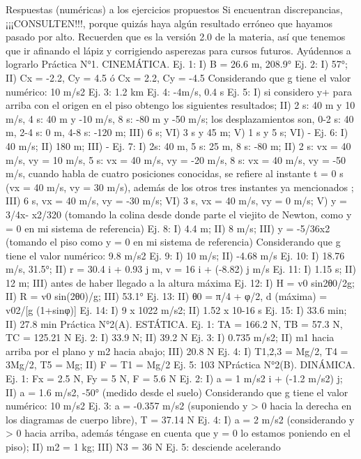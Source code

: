 Respuestas (numéricas) a los
ejercicios propuestos
Si encuentran discrepancias, ¡¡¡CONSULTEN!!!, porque
quizás haya algún resultado erróneo que hayamos pasado por
alto.
Recuerden que es la versión 2.0 de la materia, así que tenemos
que ir afinando el lápiz y corrigiendo asperezas para cursos
futuros. Ayúdennos a lograrlo 
Práctica N°1. CINEMÁTICA.
Ej. 1: I) B = 26.6 m, 208.9°
Ej. 2: I) 57°; II) Cx = -2.2, Cy = 4.5 ó Cx = 2.2, Cy = -4.5
Considerando que g tiene el valor numérico: 10 m/s2
Ej. 3: 1.2 km
Ej. 4: -4m/s, 0.4 s
Ej. 5: I) si considero y+ para arriba con el origen en el piso obtengo los siguientes
resultados; II) 2 s: 40 m y 10 m/s, 4 s: 40 m y -10 m/s, 8 s: -80 m y -50 m/s; los
desplazamientos son, 0-2 s: 40 m, 2-4 s: 0 m, 4-8 s: -120 m; III) 6 s; VI) 3 s y 45 m; V) 1 s y 5
s; VI) -
Ej. 6: I) 40 m/s; II) 180 m; III) -
Ej. 7: I) 2s: 40 m, 5 s: 25 m, 8 s: -80 m; II) 2 s: vx = 40 m/s, vy = 10 m/s, 5 s: vx = 40 m/s, vy =
-20 m/s, 8 s: vx = 40 m/s, vy = -50 m/s, cuando habla de cuatro posiciones conocidas, se
refiere al instante t = 0 s (vx = 40 m/s, vy = 30 m/s), además de los otros tres instantes ya
mencionados ; III) 6 s, vx = 40 m/s, vy = -30 m/s; VI) 3 s, vx = 40 m/s, vy = 0 m/s; V) y = 3/4x-
x2/320 (tomando la colina desde donde parte el viejito de Newton, como y = 0 en mi sistema
de referencia)
Ej. 8: I) 4.4 m; II) 8 m/s; III) y = -5/36x2 (tomando el piso como y = 0 en mi sistema de
referencia)
Considerando que g tiene el valor numérico: 9.8 m/s2
Ej. 9: I) 10 m/s; II) -4.68 m/s
Ej. 10: I) 18.76 m/s, 31.5°; II) r = 30.4 i + 0.93 j m, v = 16 i + (-8.82) j m/s
Ej. 11: I) 1.15 s; II) 12 m; III) antes de haber llegado a la altura máxima
Ej. 12: I) H = v0 sin2θ0/2g; II) R = v0 sin(2θ0)/g; III) 53.1°
Ej. 13: II) θ0 = π/4 + φ/2, d (máxima) = v02/[g (1+sinφ)]
Ej. 14: I) 9 x 1022 m/s2; II) 1.52 x 10-16 s
Ej. 15: I) 33.6 min; II) 27.8 min
Práctica N°2(A). ESTÁTICA.
Ej. 1: TA = 166.2 N, TB = 57.3 N, TC = 125.21 N
Ej. 2: I) 33.9 N; II) 39.2 N
Ej. 3: I) 0.735 m/s2; II) m1 hacia arriba por el plano y m2 hacia abajo; III) 20.8 N
Ej. 4: I) T1,2,3 = Mg/2, T4 = 3Mg/2, T5 = Mg; II) F = T1 = Mg/2
Ej. 5: 103 NPráctica N°2(B). DINÁMICA.
Ej. 1: Fx = 2.5 N, Fy = 5 N, F = 5.6 N
Ej. 2: I) a = 1 m/s2 i + (-1.2 m/s2) j; II) a = 1.6 m/s2, -50° (medido desde el suelo)
Considerando que g tiene el valor numérico: 10 m/s2
Ej. 3: a = -0.357 m/s2 (suponiendo y > 0 hacia la derecha en los diagramas de cuerpo libre),
T = 37.14 N
Ej. 4: I) a = 2 m/s2 (considerando y > 0 hacia arriba, además téngase en cuenta que y = 0 lo
estamos poniendo en el piso); II) m2 = 1 kg; III) N3 = 36 N
Ej. 5: desciende acelerando
